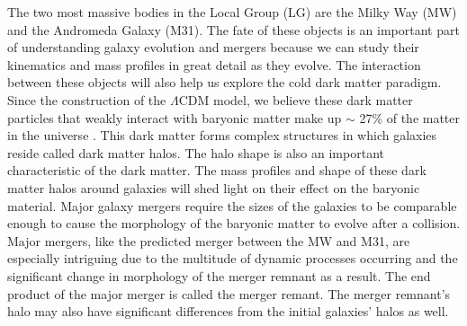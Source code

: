 \documentclass[linenumbers, twocolumn]{aastex631}
\begin{document}
The two most massive bodies in the Local Group (LG) are the Milky Way (MW) and the Andromeda Galaxy (M31). The fate of these objects is an important part of understanding galaxy evolution and mergers because we can study their kinematics and mass profiles in great detail as they evolve. 
The interaction between these objects will also help us explore the cold dark matter paradigm. Since the construction of the $\Lambda$CDM model, we believe these dark matter particles that weakly interact with baryonic matter make up $\sim$ 27\% of the matter in the universe \citep{2014LCDM}. This dark matter forms complex structures in which galaxies reside called dark matter halos. The halo shape is also an important characteristic of the dark matter.
The mass profiles and shape of these dark matter halos around galaxies will shed light on their effect on the baryonic material.
Major galaxy mergers require the sizes of the galaxies to be comparable enough to cause the morphology of the baryonic matter to evolve after a collision.
Major mergers, like the predicted merger between the MW and M31, are especially intriguing due to the multitude of dynamic processes occurring and the significant change in morphology of the merger remnant as a result. 
The end product of the major merger is called the merger remant.
The merger remnant's halo may also have significant differences from the initial galaxies' halos as well.

\end{document}
